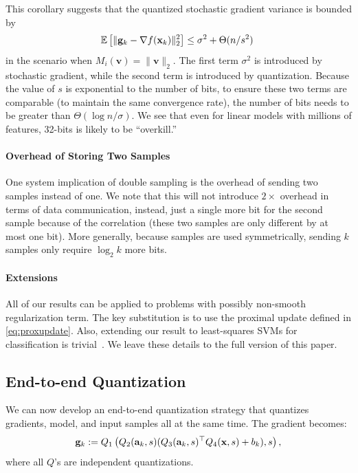 \documentclass{article}
\renewcommand{\vec}[1]{\mathbf{#1}}
\def\a{{\bf a}}
\def\g{{\bf g}}
\def\x{{\bf x}}
\def\E{\mathbb{E}}
\begin{document}
This corollary suggests that the quantized stochastic gradient variance is bounded by
\[
\E \left[ \| \g_k - \nabla f(\x_k) \|_2^2 \right] \leq \sigma^2 + \Theta(n/s^2) \;
\]
in the scenario when $M_i (\vec{v}) = \| \vec{v} \|_2 $.
The first term $\sigma^2$ is introduced by stochastic gradient, while the second term is introduced by quantization. Because the value of $s$ is 
exponential to the number of bits, to ensure these two terms are comparable (to maintain the same convergence rate), the number of bits needs to be greater than $\Theta(\log n / \sigma)$. We see that even for linear models with millions
of features, 32-bits is likely to be  ``overkill.''

\vspace{-0.5em}
\paragraph*{Overhead of Storing Two Samples}
One system implication of double sampling is the overhead of sending
two samples instead of one. We note that this will not introduce $2\times$
overhead in terms of data communication, instead, just a single more bit
for the second sample because of the correlation (these two samples 
are only different by at most one bit). More generally, because samples
are used symmetrically, sending $k$ samples only require $\log_2 k$ more bits.

\vspace{-0.5em}
\paragraph*{Extensions}

All of our results can be applied to 
 problems 
with possibly non-smooth regularization term. The key substitution is to use the proximal update defined in \eqref{eq:proxupdate}.
Also, extending our result to least-squares SVMs for classification is trivial~\cite{Suykens:1999:Book}.
We leave these details to the full version
of this paper.

\vspace{-0.5em}
\subsection{End-to-end Quantization}
\vspace{-0.5em}

We can now develop an end-to-end quantization strategy that
quantizes gradients, model, and input samples all 
at the same time. The gradient becomes:
\[
\g_k := Q_1 \left( Q_2(\a_k, s ) ( Q_3(\a_k, s)^\top Q_4(\x, s) + b_k) , s \right),
\]
\noindent 
where all $Q$'s are independent quantizations.
\end{document}
